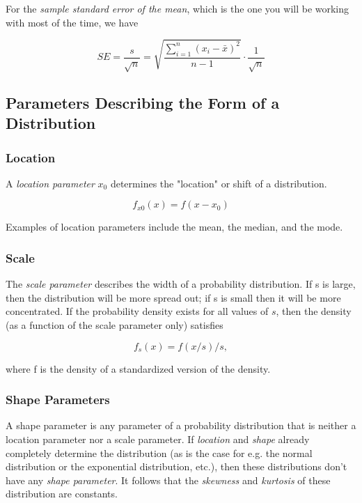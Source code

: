 For the \emph{sample standard error of the mean}, which is the one you will be working with most of the time, we have

\begin{equation}
  SE = \frac{s}{\sqrt{n}} = \sqrt{\frac{{\sum\limits_{i = 1}^n {({x_i-\bar{x}})^2} }}{n-1}} \cdot \frac{1}{\sqrt{n}}
\end{equation}

\subsection{Parameters Describing the Form of a Distribution}

\subsubsection{Location}

A \emph{location parameter} $x_0$  determines the "location" or shift of a distribution.

\begin{equation*}
  f_{x0}(x)=f(x-x_0)
\end{equation*}

Examples of location parameters include the mean, the median, and the mode.

\subsubsection{Scale}

The \emph{scale parameter} describes the width of a probability distribution.  If s is large, then the distribution will be more spread out; if s is small then it will be more concentrated. If the probability density exists for all values of $s$, then the density (as a function of the scale parameter only) satisfies

\begin{equation*}
   f_s(x) = f(x/s)/s,
\end{equation*}

where f is the density of a standardized version of the density.

\subsubsection{Shape Parameters}

A shape parameter is any parameter of a probability distribution that is neither a location parameter nor a scale parameter. If \emph{location }and \emph{shape} already completely determine the distribution (as is the case for e.g. the normal distribution or the exponential distribution, etc.), then these distributions don't have any \emph{shape parameter}. It follows that the \emph{skewness }and \emph{kurtosis} of these distribution are constants.


